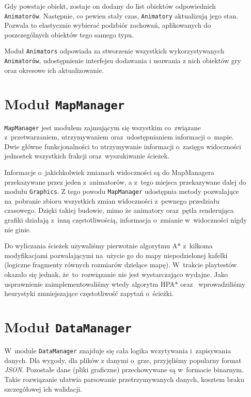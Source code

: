 \documentclass[licencjacka]{pracamgr}
\begin{document}
    Gdy powstaje obiekt, zostaje on dodany do list obiektów odpowiednich \texttt{Animatorów}. Następnie, co pewien stały czas, 
    \texttt{Animatory} aktualizują jego stan. Pozwala to elastycznie wybierać podzbiór zachowań, aplikowanych do poszczególnych
    obiektów tego samego typu. 
    
    Moduł \texttt{Animators} odpowiada za stworzenie wszystkich wykorzystywanych \texttt{Animatorów}, udostępnienie interfejsu
    dodawania i usuwania z nich obiektów gry oraz okresowe ich aktualizowanie. 
  \section{Moduł \texttt{MapManager}}
    \texttt{MapManager} jest modułem zajmującym się wszystkim co~związane z~przetwarzaniem, utrzymywaniem oraz~udostępnianiem
    informacji o~mapie. Dwie główne funkcjonalności to utrzymywanie informacji o~zasięgu widoczności jednostek wszystkich
    frakcji oraz~wyszukiwanie ścieżek.

    Informacje o~jakichkolwiek zmianach widoczności są do MapManagera przekazywane przez jeden z~animatorów, a z~tego miejsca
    przekazywane dalej do modułu \texttt{Graphics}. Z tego powodu \texttt{MapManager} udostępnia metody pozwalające na~pobranie
    zbioru wszystkich zmian widoczności z~pewnego przedziału czasowego. Dzięki takiej budowie, mimo że animatory oraz~pętla 
    renderująca grafiki działają z~inną częstotliwością, informacja o~zmianie w~widoczności nigdy nie ginie.

    Do wyliczania ścieżek używaliśmy pierwotnie algorytmu A*\cite{A*} z~kilkoma modyfikacjami pozwalającymi na~użycie go do mapy
    niepodzielonej kafelki (logiczne fragmenty równych rozmiarów dzielące mapę). W~trakcie playtestów okazało się jednak,
    że~to~rozwiązanie nie jest wystarczająco wydajne. Jako usprawnienie zaimplementowaliśmy wtedy algorytm HPA*\cite{HPA} oraz~
    wprowadziliśmy heurystyki zmniejszające częstotliwość zapytań o~ścieżki.

  \section{Moduł \texttt{DataManager}}
    W~module \texttt{DataManager} znajduje się cała logika wczytywania i~zapisywania danych. Dla wygody, dla plików z
    danymi o~grze, przyjęliśmy popularny format \emph{JSON}. Pozostałe dane (pliki graficzne) przechowywane są w~formacie
    binarnym. Takie rozwiązanie ułatwia parsowanie przetrzymywanych danych, kosztem braku szczegółowej ich walidacji.
\end{document}
